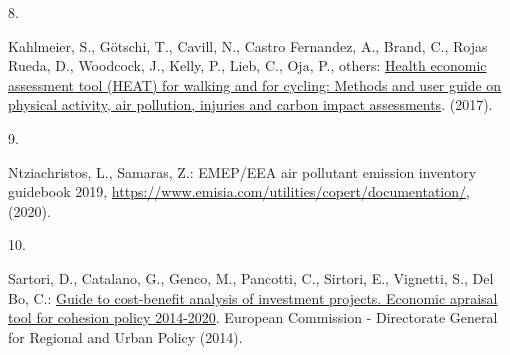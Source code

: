 \documentclass[runningheads]{llncs}
\newlength{\cslhangindent}
\newlength{\csllabelwidth}
\newenvironment{CSLReferences}[2] %
 {\begin{list}{}{%
  \setlength{\itemindent}{0pt}
  \setlength{\leftmargin}{0pt}
  \setlength{\parsep}{0pt}
  \ifodd #1
   \setlength{\leftmargin}{\cslhangindent}
   \setlength{\itemindent}{-1\cslhangindent}
  \fi
  \setlength{\itemsep}{#2\baselineskip}}}
 {\end{list}}
\newcommand{\CSLLeftMargin}[1]{\parbox[t]{\csllabelwidth}{#1}}
\newcommand{\CSLRightInline}[1]{\parbox[t]{\linewidth - \csllabelwidth}{#1}\break}
\begin{document}
\begin{CSLReferences}{0}{0}
\CSLLeftMargin{8. }%
\CSLRightInline{Kahlmeier, S., Götschi, T., Cavill, N., Castro
Fernandez, A., Brand, C., Rojas Rueda, D., Woodcock, J., Kelly, P.,
Lieb, C., Oja, P., others:
\href{https://www.euro.who.int/__data/assets/pdf_file/0010/352963/Heat.pdf}{Health
economic assessment tool ({HEAT}) for walking and for cycling: Methods
and user guide on physical activity, air pollution, injuries and carbon
impact assessments}. (2017).}

\CSLLeftMargin{9. }%
\CSLRightInline{Ntziachristos, L., Samaras, Z.: {EMEP/EEA} air pollutant
emission inventory guidebook 2019,
\url{https://www.emisia.com/utilities/copert/documentation/}, (2020).}

\CSLLeftMargin{10. }%
\CSLRightInline{Sartori, D., Catalano, G., Genco, M., Pancotti, C.,
Sirtori, E., Vignetti, S., Del Bo, C.:
\href{https://ec.europa.eu/regional_policy/sources/docgener/studies/pdf/cba_guide.pdf}{Guide
to cost-benefit analysis of investment projects. Economic apraisal tool
for cohesion policy 2014-2020}. {European Commission - Directorate
General for Regional and Urban Policy} (2014).}

\end{CSLReferences}

%
\end{document}
